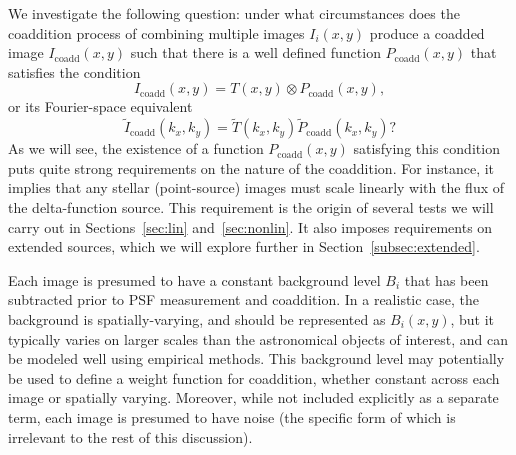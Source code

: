 \documentclass{openjournal}
\newcommand{\irresponse}[1]{{#1}}
\newcommand{\refresponse}[1]{#1}
\begin{document}
\irresponse{We investigate the following question:} under what circumstances does the coaddition process \irresponse{of combining multiple images $I_i(x,y)$} produce a coadded image \irresponse{$I_\text{coadd}(x,y)$} such that there is a well defined function $P_\text{coadd}(x,y)$ that satisfies the condition
\begin{equation}\label{eq:coaddpsf}
    I_\text{coadd}(x,y) = T(x,y) \otimes P_\text{coadd}(x,y),
\end{equation}
or its Fourier-space equivalent 
\begin{equation}\label{eq:kcoaddpsf}
    \widetilde{I}_\text{coadd}(k_x,k_y) = \widetilde{T}(k_x,k_y) \widetilde{P}_\text{coadd}(k_x,k_y)?
\end{equation}
\irresponse{As we will see, the existence of a function $P_\text{coadd}(x,y)$ satisfying this condition puts quite strong requirements on the nature of the coaddition.  For instance, it implies that any stellar (point-source) images must scale linearly with the flux of the delta-function source.  This requirement is the origin of several tests we will carry out in Sections~\ref{sec:lin} and~\ref{sec:nonlin}. It also imposes requirements on extended sources, which we will explore further in Section~\ref{subsec:extended}.}

Each image is presumed to have a \refresponse{constant} background level $B_i$ that has been subtracted prior to PSF measurement and coaddition.  \refresponse{In a realistic case, the background is spatially-varying, and should be represented as $B_i(x,y)$, but it typically varies on larger scales than the astronomical objects of interest, and can be modeled well using empirical methods.}  This background level may potentially be used to define a \refresponse{weight function for coaddition, whether constant across each image or spatially varying}.  Moreover, while not included explicitly as a separate term, each image is presumed to have noise \irresponse{(the specific form of which is irrelevant to the rest of this discussion)}.
\end{document}
